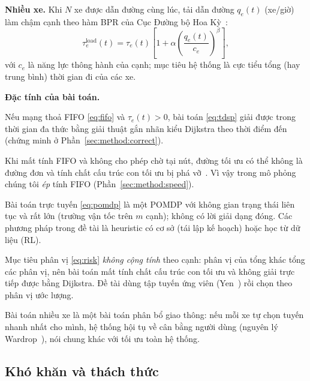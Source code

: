 \textbf{Nhiều xe.} Khi $N$ xe được dẫn đường cùng lúc, tải dẫn đường $q_e(t)$ (xe/giờ) làm chậm cạnh theo hàm BPR của
Cục Đường bộ Hoa Kỳ~\cite{bpr1964}:
\begin{equation}
\tau^{\text{load}}_e(t) = \tau_e(t)\left[1+\alpha\left(\frac{q_e(t)}{c_e}\right)^{\beta}\right],
\label{eq:bpr}
\end{equation}
với $c_e$ là năng lực thông hành của cạnh; mục tiêu hệ thống là cực tiểu tổng (hay trung bình) thời gian đi của các xe.

\textbf{Đặc tính của bài toán.}
\begin{dl}\label{dl:poly}
Nếu mạng thoả FIFO \eqref{eq:fifo} và $\tau_e(t)>0$, bài toán \eqref{eq:tdsp} giải được trong thời gian đa thức bằng giải
thuật gắn nhãn kiểu Dijkstra theo thời điểm đến (chứng minh ở Phần~\ref{sec:method:correct}).
\end{dl}

\begin{nx}
Khi mất tính FIFO và không cho phép chờ tại nút, đường tối ưu có thể không là đường đơn và tính chất cấu trúc con tối
ưu bị phá vỡ~\cite{orda1990}. Vì vậy trong mô phỏng chúng tôi \emph{ép} tính FIFO (Phần~\ref{sec:method:speed}).
\end{nx}

\begin{nx}
Bài toán trực tuyến \eqref{eq:pomdp} là một POMDP với không gian trạng thái liên tục và rất lớn (trường vận tốc trên
$m$ cạnh); không có lời giải dạng đóng. Các phương pháp trong đề tài là heuristic có cơ sở (tái lập kế hoạch) hoặc học
từ dữ liệu (RL).
\end{nx}

\begin{nx}
Mục tiêu phân vị \eqref{eq:risk} \emph{không cộng tính} theo cạnh: phân vị của tổng khác tổng các phân vị, nên bài toán
mất tính chất cấu trúc con tối ưu và không giải trực tiếp được bằng Dijkstra. Đề tài dùng tập tuyến ứng viên
(Yen~\cite{yen1971}) rồi chọn theo phân vị ước lượng.
\end{nx}

\begin{nx}
Bài toán nhiều xe là một bài toán phân bổ giao thông: nếu mỗi xe tự chọn tuyến nhanh nhất cho mình, hệ thống hội tụ về
cân bằng người dùng (nguyên lý Wardrop~\cite{wardrop1952}), nói chung khác với tối ưu toàn hệ thống.
\end{nx}

\subsection{Khó khăn và thách thức}\label{sec:problem:challenges}

